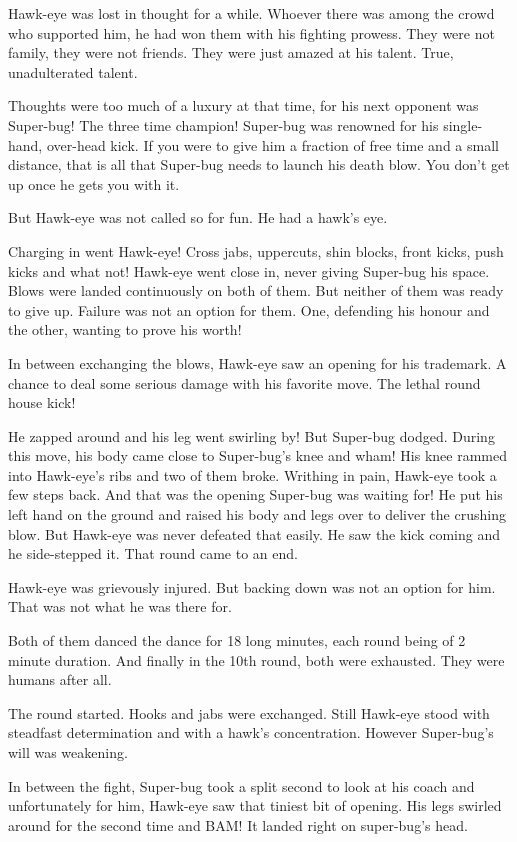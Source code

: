 \documentclass[twoside,11pt,titlepage]{article}
\begin{document}
Hawk-eye was lost in thought for a while. Whoever there was among the crowd who supported him, he had won them with his fighting prowess. They were not family, they were not friends. They were just amazed at his talent. True, unadulterated talent.

Thoughts were too much of a luxury at that time, for his next opponent was Super-bug! The three time champion! Super-bug was renowned for his single-hand, over-head kick. If you were to give him a fraction of free time and a small distance, that is all that Super-bug needs to launch his death blow. You don't get up once he gets you with it.

But Hawk-eye was not called so for fun. He had a hawk's eye.

Charging in went Hawk-eye! Cross jabs, uppercuts, shin blocks, front kicks, push kicks and what not! Hawk-eye went close in, never giving Super-bug his space. Blows were landed continuously on both of them. But neither of them was ready to give up. Failure was not an option for them. One, defending his honour and the other, wanting to prove his worth!

In between exchanging the blows, Hawk-eye saw an opening for his trademark. A chance to deal some serious damage with his favorite move. The lethal round house kick!

He zapped around and his leg went swirling by! But Super-bug dodged. During this move, his body came close to Super-bug's knee and wham! His knee rammed into Hawk-eye's ribs and two of them broke. Writhing in pain, Hawk-eye took a few steps back. And that was the opening Super-bug was waiting for! He put his left hand on the ground and raised his body and legs over to deliver the crushing blow. But Hawk-eye was never defeated that easily. He saw the kick coming and he side-stepped it. That round came to an end.

Hawk-eye was grievously injured. But backing down was not an option for him. That was not what he was there for.

Both of them danced the dance for 18 long minutes, each round being of 2 minute duration. And finally in the 10th round, both were exhausted. They were humans after all.

The round started. Hooks and jabs were exchanged. Still Hawk-eye stood with steadfast determination and with a hawk's concentration. However Super-bug's will was weakening.

In between the fight, Super-bug took a split second to look at his coach and unfortunately for him, Hawk-eye saw that tiniest bit of opening. His legs swirled around for the second time and BAM! It landed right on super-bug's head.
\end{document}
